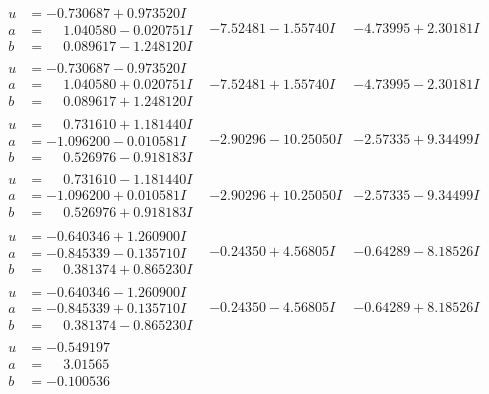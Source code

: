 \documentclass[1p]{elsarticle_modified}
\theoremstyle{definition}
\begin{document}
$$\begin{array}{c|c|c}
\begin{aligned}
u &= -0.730687 + 0.973520 I \\
a &= \phantom{-}1.040580 - 0.020751 I \\
b &= \phantom{-}0.089617 - 1.248120 I\end{aligned}
 & -7.52481 - 1.55740 I & -4.73995 + 2.30181 I \\ \hline\begin{aligned}
u &= -0.730687 - 0.973520 I \\
a &= \phantom{-}1.040580 + 0.020751 I \\
b &= \phantom{-}0.089617 + 1.248120 I\end{aligned}
 & -7.52481 + 1.55740 I & -4.73995 - 2.30181 I \\ \hline\begin{aligned}
u &= \phantom{-}0.731610 + 1.181440 I \\
a &= -1.096200 - 0.010581 I \\
b &= \phantom{-}0.526976 - 0.918183 I\end{aligned}
 & -2.90296 - 10.25050 I & -2.57335 + 9.34499 I \\ \hline\begin{aligned}
u &= \phantom{-}0.731610 - 1.181440 I \\
a &= -1.096200 + 0.010581 I \\
b &= \phantom{-}0.526976 + 0.918183 I\end{aligned}
 & -2.90296 + 10.25050 I & -2.57335 - 9.34499 I \\ \hline\begin{aligned}
u &= -0.640346 + 1.260900 I \\
a &= -0.845339 - 0.135710 I \\
b &= \phantom{-}0.381374 + 0.865230 I\end{aligned}
 & -0.24350 + 4.56805 I & -0.64289 - 8.18526 I \\ \hline\begin{aligned}
u &= -0.640346 - 1.260900 I \\
a &= -0.845339 + 0.135710 I \\
b &= \phantom{-}0.381374 - 0.865230 I\end{aligned}
 & -0.24350 - 4.56805 I & -0.64289 + 8.18526 I \\ \hline\begin{aligned}
u &= -0.549197\phantom{ +0.000000I} \\
a &= \phantom{-}3.01565\phantom{ +0.000000I} \\
b &= -0.100536\phantom{ +0.000000I}\end{aligned}

\end{array}$$
\end{document}

